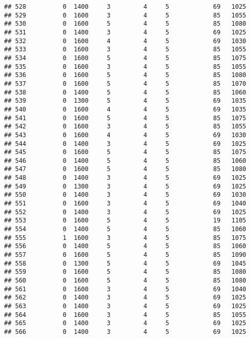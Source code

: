 \documentclass[]{article}
\begin{document}
\begin{verbatim}
## 528          0  1400     3         4     5            69   1025
## 529          0  1600     3         4     5            85   1055
## 530          0  1600     5         4     5            85   1080
## 531          0  1400     3         4     5            69   1025
## 532          0  1600     4         4     5            69   1030
## 533          0  1600     3         4     5            85   1055
## 534          0  1600     5         4     5            85   1075
## 535          0  1600     3         4     5            85   1055
## 536          0  1600     5         4     5            85   1080
## 537          0  1600     5         4     5            85   1070
## 538          0  1400     5         4     5            85   1060
## 539          0  1300     5         4     5            69   1035
## 540          0  1600     4         4     5            69   1035
## 541          0  1600     5         4     5            85   1075
## 542          0  1600     3         4     5            85   1055
## 543          0  1600     4         4     5            69   1030
## 544          0  1400     3         4     5            69   1025
## 545          0  1600     5         4     5            85   1075
## 546          0  1400     5         4     5            85   1060
## 547          0  1600     5         4     5            85   1080
## 548          0  1400     3         4     5            69   1025
## 549          0  1300     3         4     5            69   1025
## 550          0  1400     3         4     5            69   1030
## 551          0  1600     3         4     5            69   1040
## 552          0  1400     3         4     5            69   1025
## 553          0  1600     5         4     5            19   1105
## 554          0  1400     5         4     5            85   1060
## 555          1  1600     3         4     5            85   1075
## 556          0  1400     5         4     5            85   1060
## 557          0  1600     5         4     5            85   1090
## 558          0  1300     5         4     5            69   1045
## 559          0  1600     5         4     5            85   1080
## 560          0  1600     5         4     5            85   1080
## 561          0  1600     3         4     5            69   1040
## 562          0  1400     3         4     5            69   1025
## 563          0  1400     3         4     5            69   1025
## 564          0  1600     3         4     5            85   1055
## 565          0  1400     3         4     5            69   1025
## 566          0  1400     3         4     5            69   1025

\end{verbatim}
\end{document}
